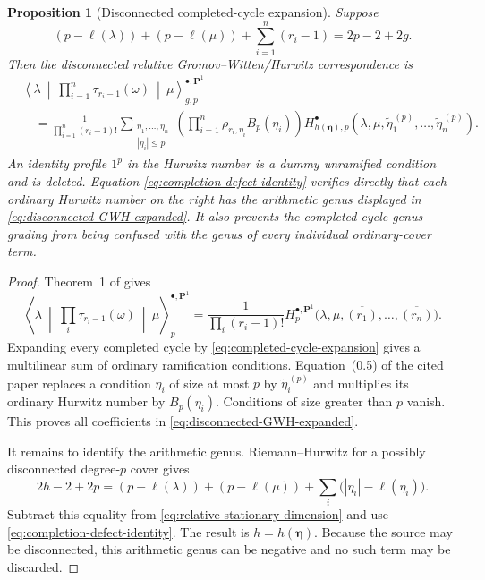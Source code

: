 \documentclass[11pt]{amsart}
\theoremstyle{plain}
\newtheorem{proposition}[theorem]{Proposition}
\theoremstyle{definition}
\numberwithin{equation}{section}
\begin{document}
\begin{proposition}[Disconnected completed-cycle expansion]
\label{prop:disconnected-completed-cycle-expansion}
Suppose
\begin{equation}\label{eq:relative-stationary-dimension}
 (p-\ell(\lambda))+(p-\ell(\mu))
 +\sum_{i=1}^n(r_i-1)=2p-2+2g.
\end{equation}
Then the disconnected relative Gromov--Witten/Hurwitz correspondence is
\begin{align}
&\left\langle\lambda\ \middle|\
   \prod_{i=1}^n\tau_{r_i-1}(\omega)\
   \middle|\ \mu\right\rangle^{\bullet,\mathbf P^1}_{g,p}
\label{eq:disconnected-GWH-expanded}\\
&\quad=
 \frac1{\prod_{i=1}^n(r_i-1)!}
 \sum_{\substack{\eta_1,\ldots,\eta_n\\|\eta_i|\leq p}}
 \left(\prod_{i=1}^n\rho_{r_i,\eta_i}B_p(\eta_i)\right)
 H^\bullet_{h(\boldsymbol\eta),p}
 \left(\lambda,\mu,
       \widetilde\eta_1^{\,(p)},\ldots,
       \widetilde\eta_n^{\,(p)}\right).
\nonumber
\end{align}
An identity profile $1^p$ in the Hurwitz number is a dummy unramified
condition and is deleted.  Equation
\eqref{eq:completion-defect-identity} verifies directly that each ordinary
Hurwitz number on the right has the arithmetic genus displayed in
\eqref{eq:disconnected-GWH-expanded}.  It also prevents the
completed-cycle genus grading from being confused with the genus of every
individual ordinary-cover term.
\end{proposition}

\begin{proof}
Theorem~1 of \cite{OkounkovPandharipande} gives
\[
 \left\langle\lambda\ \middle|\
   \prod_i\tau_{r_i-1}(\omega)\
   \middle|\ \mu\right\rangle^{\bullet,\mathbf P^1}_{p}
 =\frac1{\prod_i(r_i-1)!}
 H^{\bullet,\mathbf P^1}_{p}
 \bigl(\lambda,\mu,
       \overline{(r_1)},\ldots,\overline{(r_n)}\bigr).
\]
Expanding every completed cycle by
\eqref{eq:completed-cycle-expansion} gives a multilinear sum of ordinary
ramification conditions.  Equation~(0.5) of the cited paper replaces a
condition $\eta_i$ of size at most $p$ by
$\widetilde\eta_i^{\,(p)}$ and multiplies its ordinary Hurwitz number by
$B_p(\eta_i)$.  Conditions of size greater than $p$ vanish.  This proves
all coefficients in \eqref{eq:disconnected-GWH-expanded}.

It remains to identify the arithmetic genus.  Riemann--Hurwitz for a
possibly disconnected degree-$p$ cover gives
\[
 2h-2+2p
 =(p-\ell(\lambda))+(p-\ell(\mu))
  +\sum_i\bigl(|\eta_i|-\ell(\eta_i)\bigr).
\]
Subtract this equality from
\eqref{eq:relative-stationary-dimension} and use
\eqref{eq:completion-defect-identity}.  The result is
$h=h(\boldsymbol\eta)$.  Because the source may be disconnected, this
arithmetic genus can be negative and no such term may be discarded.
\end{proof}
\end{document}
